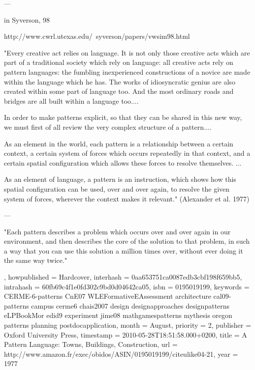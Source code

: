 {{---

in Syverson, 98



http://www.cwrl.utexas.edu/~syverson/papers/vwsim98.html



"Every creative act relies on language. It is not only those creative acts which are part of a traditional society which rely on language: all creative acts rely on pattern languages: the fumbling inexperienced constructions of a novice are made within the language which he has. The works of idiosyncratic genius are also created within some part of language too. And the most ordinary roads and bridges are all built within a language too....



In order to make patterns explicit, so that they can be shared in this new way, we must first of all review the very complex structure of a pattern....



As an element in the world, each pattern is a relationship between a certain context, a certain system of forces which occurs repeatedly in that context, and a certain spatial configuration which allows these forces to resolve themselves. ...



As an element of language, a pattern is an instruction, which shows how this spatial configuration can be used, over and over again, to resolve the given system of forces, wherever the context makes it relevant." (Alexander et al. 1977)

---

"Each pattern describes a problem which occurs over and over again in our environment, and then describes the core of the solution to that problem, in such a way that you can use this solution a million times over, without ever doing it the same way twice."},
  howpublished = {Hardcover},
  interhash = {0aa653751ca0087edb3cbf198f659bb5},
  intrahash = {60fb69c4f1e0fd302c9bd0d04642ca05},
  isbn = {0195019199},
  keywords = {CERME-6-patterns CnE07 WLEFormativeEAssessment architecture cal09-patterns campus cerme6 chais2007 design designapproaches designpatterns eLPBookMor edid9 experiment jime08 mathgamespatterns mythesis oregon patterns planning postdocapplication},
  month = {August},
  priority = {2},
  publisher = {Oxford University Press},
  timestamp = {2010-05-28T18:51:58.000+0200},
  title = {A Pattern Language: Towns, Buildings, Construction},
  url = {http://www.amazon.fr/exec/obidos/ASIN/0195019199/citeulike04-21},
  year = 1977
}


